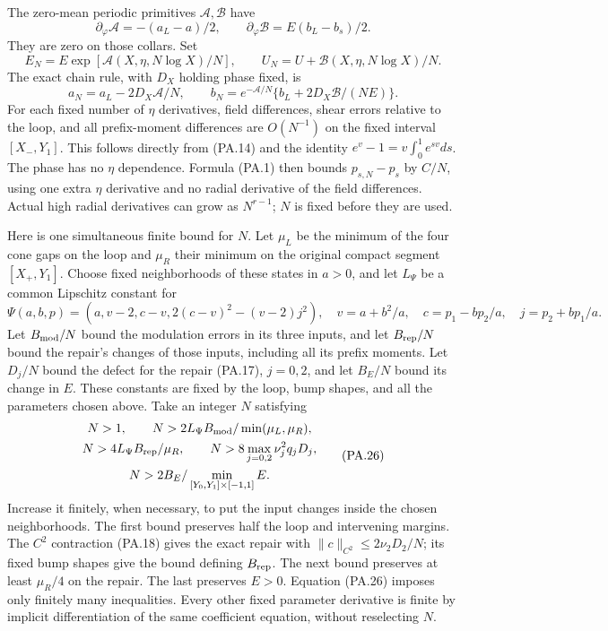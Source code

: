 \documentclass[10pt,a4paper]{article}
\begin{document}
The zero-mean periodic primitives $\mathscr A,\mathscr B$ have
\[
 \partial_\varphi\mathscr A=-(a_L-a)/2,\qquad
 \partial_\varphi\mathscr B=E(b_L-b_s)/2.
\]
They are zero on those collars. Set
\[
 E_N=E\exp[\mathscr A(X,\eta,N\log X)/N],\qquad
 U_N=U+\mathscr B(X,\eta,N\log X)/N.
\]
The exact chain rule, with $D_X$ holding phase fixed, is
\[
 a_N=a_L-2D_X\mathscr A/N,\qquad
 b_N=e^{-\mathscr A/N}\{b_L+2D_X\mathscr B/(NE)\}.               \tag{PA.25}
\]
For each fixed number of $\eta$ derivatives, field differences, shear errors
relative to the loop, and all prefix-moment differences are $O(N^{-1})$ on
the fixed interval $[X_-,Y_1]$. This follows directly from (PA.14) and the identity
$e^v-1=v\int_0^1e^{sv}ds$. The phase has no $\eta$ dependence. Formula (PA.1)
then bounds $p_{s,N}-p_s$ by $C/N$, using one extra $\eta$ derivative and
no radial derivative of the field differences. Actual high radial derivatives
can grow as $N^{r-1}$; $N$ is fixed before they are used.

Here is one simultaneous finite bound for $N$. Let $\mu_L$ be the minimum
of the four cone gaps on the loop and $\mu_R$ their minimum on the original
compact segment $[X_+,Y_1]$. Choose fixed neighborhoods of these states in
$a>0$, and let $L_\Psi$ be a common Lipschitz constant for
\[
 \Psi(a,b,p)=\left(a,v-2,c-v,2(c-v)^2-(v-2)j^2\right),
 \quad v=a+b^2/a,\quad c=p_1-bp_2/a,\quad j=p_2+bp_1/a.
\]
Let $B_{\rm mod}/N$ bound the modulation errors in its three inputs, and
let $B_{\rm rep}/N$ bound the repair's changes of those inputs, including all
its prefix moments. Let $D_j/N$ bound the defect for the repair (PA.17),
$j=0,2$, and let $B_E/N$ bound its change in $E$. These constants are fixed
by the loop, bump shapes, and all the parameters chosen above. Take an integer
$N$ satisfying
\[
\begin{gathered}
 N>1,\qquad
 N>2L_\Psi B_{\rm mod}/\min(\mu_L,\mu_R),\\
 N>4L_\Psi B_{\rm rep}/\mu_R,\qquad
 N>8\max_{j=0,2}\nu_j^2q_jD_j,\\
 N>2B_E/\min_{[Y_0,Y_1]\times[-1,1]}E .
\end{gathered}                                                     \tag{PA.26}
\]
Increase it finitely, when necessary, to put the input changes inside the chosen
neighborhoods. The first bound preserves half the loop and intervening margins.
The $C^2$ contraction (PA.18) gives the exact repair with
$\|c\|_{C^2}\le2\nu_2D_2/N$; its fixed bump shapes give the bound defining
$B_{\rm rep}$. The next bound preserves at least $\mu_R/4$ on the repair.
The last preserves $E>0$. Equation (PA.26) imposes only finitely many inequalities.
Every other fixed parameter derivative is finite by implicit differentiation of
the same coefficient equation, without reselecting $N$.
\end{document}
